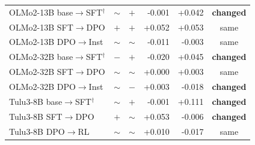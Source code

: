 \begin{table}[t]
\begin{tabular}{lccrrc}
\quad OLMo2-13B base$\to$SFT$^\dagger$ & $\sim$ & $+$ & -0.001 & +0.042 & \textbf{changed} \\
\quad OLMo2-13B SFT$\to$DPO & $+$ & $+$ & +0.052 & +0.053 & same \\
\quad OLMo2-13B DPO$\to$Inst & $\sim$ & $\sim$ & -0.011 & -0.003 & same \\
\quad OLMo2-32B base$\to$SFT$^\dagger$ & $-$ & $+$ & -0.020 & +0.045 & \textbf{changed} \\
\quad OLMo2-32B SFT$\to$DPO & $\sim$ & $\sim$ & +0.000 & +0.003 & same \\
\quad OLMo2-32B DPO$\to$Inst & $\sim$ & $-$ & +0.003 & -0.018 & \textbf{changed} \\
\quad Tulu3-8B base$\to$SFT$^\dagger$ & $\sim$ & $+$ & -0.001 & +0.111 & \textbf{changed} \\
\quad Tulu3-8B SFT$\to$DPO & $+$ & $\sim$ & +0.053 & -0.006 & \textbf{changed} \\
\quad Tulu3-8B DPO$\to$RL & $\sim$ & $\sim$ & +0.010 & -0.017 & same \\
\bottomrule
\end{tabular}
\end{table}

